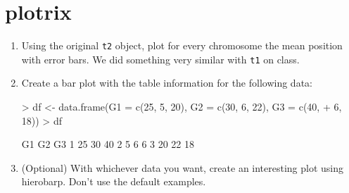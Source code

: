 \documentclass[letterpaper,12pt]{article}
\newcommand{\pl}[1]{\texttt{#1}}
\begin{document}
\section{plotrix}
  \begin{enumerate}
  \item Using the original \pl{t2} object, plot for every chromosome the mean position with error bars. We did something very similar with \pl{t1} on class.
  \item Create a bar plot with the table information for the following data:
\begin{Schunk}
\begin{Sinput}
> df <- data.frame(G1 = c(25, 5, 20), G2 = c(30, 6, 22), G3 = c(40, 
+     6, 18))
> df
\end{Sinput}
\begin{Soutput}
  G1 G2 G3
1 25 30 40
2  5  6  6
3 20 22 18
\end{Soutput}
\end{Schunk}
  \item (Optional) With whichever data you want, create an interesting plot using hierobarp. Don't use the default examples. 
  \end{enumerate}
\end{document}
